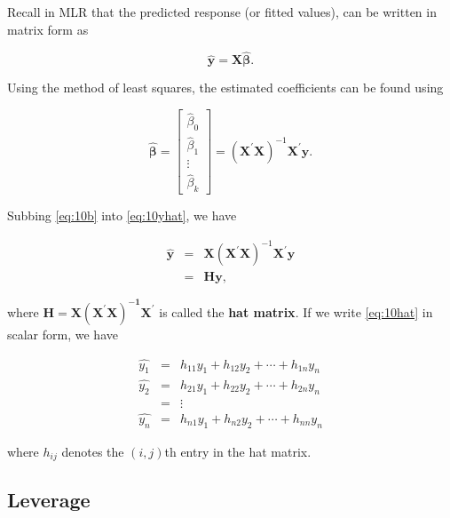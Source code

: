 \documentclass[
]{book}
\begin{document}
Recall in MLR that the predicted response (or fitted values), can be written in matrix form as

\begin{equation} 
\boldsymbol{\hat{y}} = \boldsymbol{X\hat{\beta}}.
\label{eq:10yhat}
\end{equation}

Using the method of least squares, the estimated coefficients can be found using

\begin{equation} 
\boldsymbol{\hat{\beta}} = \left[
\begin{array}{c}
   \hat{\beta}_0  \\
   \hat{\beta}_1 \\
   \vdots \\
   \hat{\beta}_k
\end{array}
\right]  =
\left(\boldsymbol{X}^{\prime} \boldsymbol{X} \right)^{-1} \boldsymbol{X}^{\prime} \boldsymbol{y} .
\label{eq:10b}
\end{equation}

Subbing \eqref{eq:10b} into \eqref{eq:10yhat}, we have

\begin{eqnarray}
\boldsymbol{\hat{y}} &=& \boldsymbol{X} \left(\boldsymbol{X}^{\prime} \boldsymbol{X} \right)^{-1} \boldsymbol{X}^{\prime} \boldsymbol{y} \nonumber \\
                     &=& \boldsymbol{Hy},
\label{eq:10hat}
\end{eqnarray}

where \(\boldsymbol{H} = \boldsymbol{X (X^{\prime}X)^{-1}X^\prime}\) is called the \textbf{hat matrix}. If we write \eqref{eq:10hat} in scalar form, we have

\begin{eqnarray*}
\hat{y_1} &=& h_{11}y_1 + h_{12}y_2 + \cdots + h_{1n}y_n \nonumber \\
\hat{y_2} &=& h_{21}y_1 + h_{22}y_2 + \cdots + h_{2n}y_n \nonumber \\
 &=& \vdots \nonumber \\
\hat{y_n} &=& h_{n1}y_1 + h_{n2}y_2 + \cdots + h_{nn}y_n \nonumber 
\end{eqnarray*}

where \(h_{ij}\) denotes the \((i,j)\)th entry in the hat matrix.

\hypertarget{leverage}{%
\subsection{Leverage}\label{leverage}}
\end{document}
